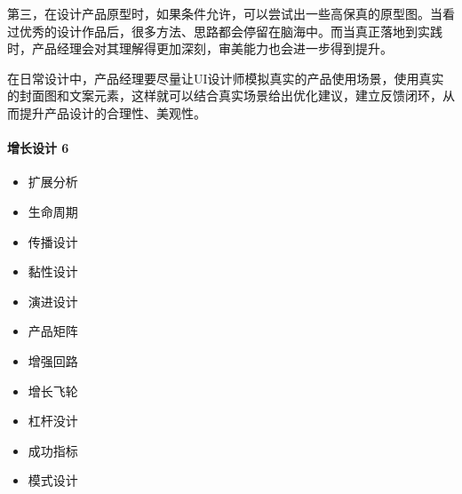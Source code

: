 \documentclass[letterpaper,11pt,english]{sphinxmanual}
\begin{document}
第三，在设计产品原型时，如果条件允许，可以尝试出一些高保真的原型图。当看过优秀的设计作品后，很多方法、思路都会停留在脑海中。而当真正落地到实践时，产品经理会对其理解得更加深刻，审美能力也会进一步得到提升。

在日常设计中，产品经理要尽量让UI设计师模拟真实的产品使用场景，使用真实的封面图和文案元素，这样就可以结合真实场景给出优化建议，建立反馈闭环，从而提升产品设计的合理性、美观性。


\paragraph{增长设计 6\sphinxfootnotemark[388]}
\label{\detokenize{chapter_idea/design:id8}}\label{\detokenize{chapter_idea/design:id9}}%
\begin{footnotetext}[388]\sphinxAtStartFootnote
{}
%
\end{footnotetext}\ignorespaces \begin{itemize}
\item {} 
扩展分析

\item {} 
生命周期

\item {} 
传播设计

\item {} 
黏性设计

\item {} 
演进设计

\item {} 
产品矩阵

\item {} 
增强回路

\item {} 
增长飞轮

\item {} 
杠杆没计

\item {} 
成功指标

\item {} 
模式设计

\end{itemize}
\end{document}
